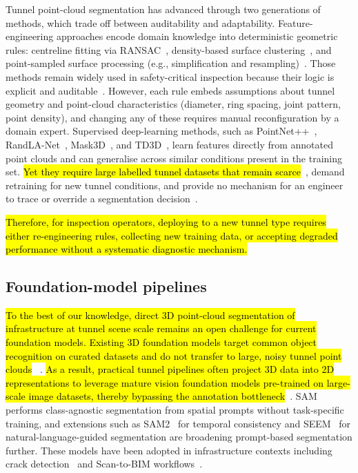 \documentclass[a4paper,fleqn]{cas-dc}
\begin{document}
{Tunnel point-cloud segmentation has advanced through two generations of methods, which trade off between auditability and adaptability. Feature-engineering approaches encode domain knowledge into deterministic geometric rules: centreline fitting via RANSAC~\cite{fischler1981ransac}, density-based surface clustering~\cite{ester1996dbscan}, and point-sampled surface processing (e.g., simplification and resampling)~\cite{pauly2002}. Those methods remain widely used in safety-critical inspection because their logic is explicit and auditable~\cite{weidner2024generalized}. However, each rule embeds assumptions about tunnel geometry and point-cloud characteristics (diameter, ring spacing, joint pattern, point density), and changing any of these requires manual reconfiguration by a domain expert. Supervised deep-learning methods, such as PointNet++~\cite{qi2017pointnet}, RandLA-Net~\cite{hu2020randla}, Mask3D~\cite{schult2023mask3d}, and TD3D~\cite{kolodiazhnyi2024td3d}, learn features directly from annotated point clouds and can generalise across similar conditions present in the training set. \hl{Yet they require large labelled tunnel datasets that remain scarce}~\cite{su2024review}, demand retraining for new tunnel conditions, and provide no mechanism for an engineer to trace or override a segmentation decision~\cite{cha2024deep}.

\hl{Therefore, for inspection operators, deploying to a new tunnel type requires either re-engineering rules, collecting new training data, or accepting degraded performance without a systematic diagnostic mechanism.}

\subsection{Foundation-model pipelines}

\hl{To the best of our knowledge, direct 3D point-cloud segmentation of infrastructure at tunnel scene scale remains an open challenge for current foundation models. Existing 3D foundation models target common object recognition on curated datasets and do not transfer to large, noisy tunnel point clouds} ~\cite{camuffo2022recent, liu2023openshape, guo2023pointbind, xu2024pointllm}. \hl{As a result, practical tunnel pipelines often project 3D data into 2D representations to leverage mature vision foundation models pre-trained on large-scale image datasets, thereby bypassing the annotation bottleneck}~\cite{caron2021dino, franceschelli2025training}. SAM~\cite{kirillov2023sam} performs class-agnostic segmentation from spatial prompts without task-specific training, and extensions such as SAM2~\cite{ravi2024sam2} for temporal consistency and SEEM~\cite{zou2023segment} for natural-language-guided segmentation are broadening prompt-based segmentation further. These models have been adopted in infrastructure contexts including crack detection~\cite{ravi2024cracksam} and Scan-to-BIM workflows~\cite{wang2024omni, pan2023zero}.

}
\end{document}
